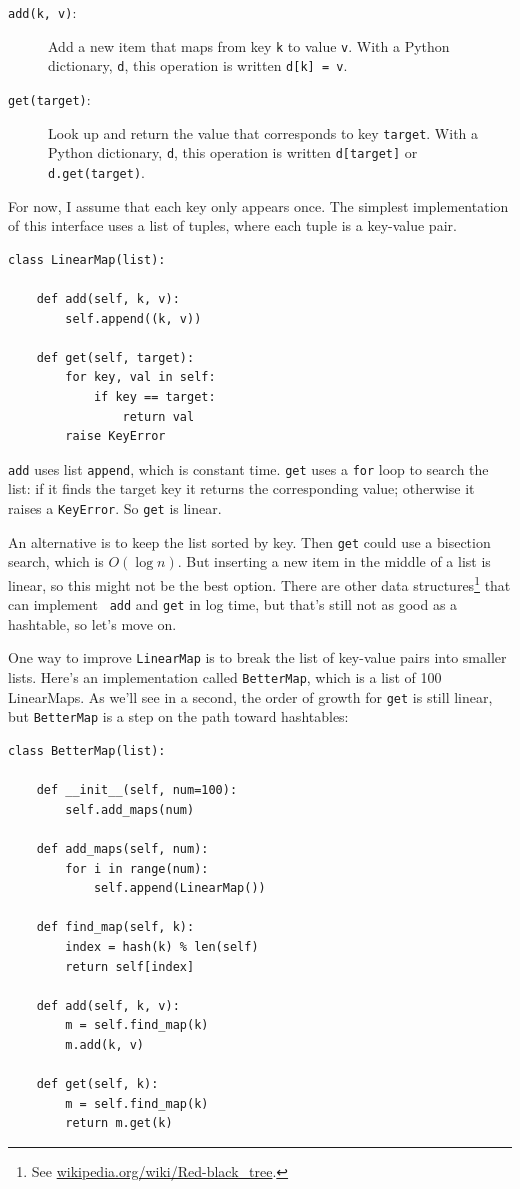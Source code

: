 \documentclass[10pt]{book}
\begin{document}
\begin{description}

\item[{\tt add(k, v)}:] Add a new item that maps from key {\tt k}
to value {\tt v}.  With a Python dictionary, {\tt d}, this operation
is written {\tt d[k] = v}.

\item[{\tt get(target)}:] Look up and return the value that corresponds
to key {\tt target}.  With a Python dictionary, {\tt d}, this operation
is written {\tt d[target]} or {\tt d.get(target)}.

\end{description}

For now, I assume that each key only appears once.
The simplest implementation of this interface uses a list of
tuples, where each tuple is a key-value pair.


\begin{verbatim}
class LinearMap(list):

    def add(self, k, v):
        self.append((k, v))

    def get(self, target):
        for key, val in self:
            if key == target:
                return val
        raise KeyError
\end{verbatim}

{\tt add} uses list {\tt append}, which is constant
time.  {\tt get} uses a {\tt for} loop to search the list:
if it finds the target key it returns the corresponding value;
otherwise it raises a {\tt KeyError}.
So {\tt get} is linear.

An alternative is to keep the list sorted by key.  Then {\tt get}
could use a bisection search, which is $O(\log n)$.  But inserting a
new item in the middle of a list is linear, so this might not be the
best option.  There are other data structures\footnote{See
  \url{wikipedia.org/wiki/Red-black_tree}.}  that can implement {\tt
  add} and {\tt get} in log time, but that's still not as good as a
hashtable, so let's move on.

One way to improve {\tt LinearMap} is to break the list of key-value
pairs into smaller lists.  Here's an implementation called
{\tt BetterMap}, which is a list of 100 LinearMaps.  As we'll see
in a second, the order of growth for {\tt get} is still linear,
but {\tt BetterMap} is a step on the path toward hashtables:

\begin{verbatim}
class BetterMap(list):

    def __init__(self, num=100):
        self.add_maps(num)
        
    def add_maps(self, num):
        for i in range(num):
            self.append(LinearMap())

    def find_map(self, k):
        index = hash(k) % len(self)
        return self[index]

    def add(self, k, v):
        m = self.find_map(k)
        m.add(k, v)

    def get(self, k):
        m = self.find_map(k)
        return m.get(k)
\end{verbatim}
\end{document}

